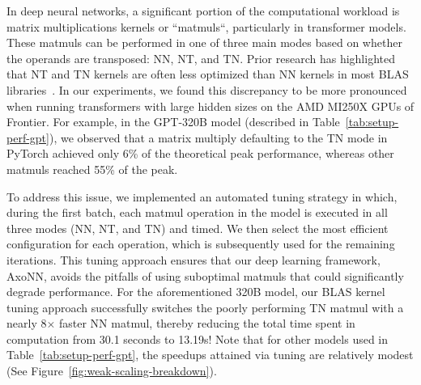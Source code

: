 In deep neural networks, a significant portion of the computational workload is
matrix multiplications kernels or ``matmuls``, particularly in transformer
models. These matmuls can be performed in one of three main modes based on
whether the operands are transposed: NN, NT, and TN. Prior research has
highlighted that NT and TN kernels are often less optimized than NN kernels in
most BLAS libraries~\cite{shi2017tnvnn}. In our experiments, we found this
discrepancy to be more pronounced when running transformers with large hidden
sizes on the AMD MI250X GPUs of Frontier. For example, in the GPT-320B model
(described in Table~\ref{tab:setup-perf-gpt}), we observed that a matrix
multiply defaulting to the TN mode in PyTorch achieved only 6\% of the
theoretical peak performance, whereas other matmuls reached 55\% of the peak.

To address this issue, we implemented an automated tuning strategy in which,
during the first batch, each matmul operation in the model is executed in all
three modes (NN, NT, and TN) and timed. We then select the most efficient
configuration for each operation, which is subsequently used for the remaining
iterations. This tuning approach ensures that our deep learning framework,
AxoNN, avoids the pitfalls of using suboptimal matmuls that could significantly
degrade performance. For the aforementioned 320B model, our BLAS kernel tuning
approach successfully switches the poorly performing TN matmul with a nearly
8$\times$ faster NN matmul, thereby reducing the total time spent in
computation from 30.1 seconds to 13.19s! Note that for other models used in
Table~\ref{tab:setup-perf-gpt}, the speedups attained via tuning are relatively
modest (See Figure~\ref{fig:weak-scaling-breakdown}).
